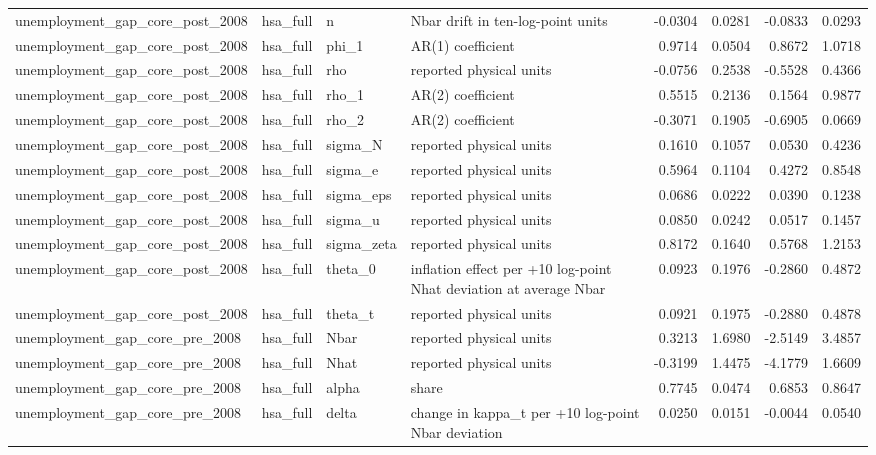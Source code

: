 \begin{tabular}{llllrrrr}
unemployment\_gap\_core\_post\_2008 & hsa\_full & n & Nbar drift in ten-log-point units & -0.0304 & 0.0281 & -0.0833 & 0.0293 \\
unemployment\_gap\_core\_post\_2008 & hsa\_full & phi\_1 & AR(1) coefficient & 0.9714 & 0.0504 & 0.8672 & 1.0718 \\
unemployment\_gap\_core\_post\_2008 & hsa\_full & rho & reported physical units & -0.0756 & 0.2538 & -0.5528 & 0.4366 \\
unemployment\_gap\_core\_post\_2008 & hsa\_full & rho\_1 & AR(2) coefficient & 0.5515 & 0.2136 & 0.1564 & 0.9877 \\
unemployment\_gap\_core\_post\_2008 & hsa\_full & rho\_2 & AR(2) coefficient & -0.3071 & 0.1905 & -0.6905 & 0.0669 \\
unemployment\_gap\_core\_post\_2008 & hsa\_full & sigma\_N & reported physical units & 0.1610 & 0.1057 & 0.0530 & 0.4236 \\
unemployment\_gap\_core\_post\_2008 & hsa\_full & sigma\_e & reported physical units & 0.5964 & 0.1104 & 0.4272 & 0.8548 \\
unemployment\_gap\_core\_post\_2008 & hsa\_full & sigma\_eps & reported physical units & 0.0686 & 0.0222 & 0.0390 & 0.1238 \\
unemployment\_gap\_core\_post\_2008 & hsa\_full & sigma\_u & reported physical units & 0.0850 & 0.0242 & 0.0517 & 0.1457 \\
unemployment\_gap\_core\_post\_2008 & hsa\_full & sigma\_zeta & reported physical units & 0.8172 & 0.1640 & 0.5768 & 1.2153 \\
unemployment\_gap\_core\_post\_2008 & hsa\_full & theta\_0 & inflation effect per +10 log-point Nhat deviation at average Nbar & 0.0923 & 0.1976 & -0.2860 & 0.4872 \\
unemployment\_gap\_core\_post\_2008 & hsa\_full & theta\_t & reported physical units & 0.0921 & 0.1975 & -0.2880 & 0.4878 \\
unemployment\_gap\_core\_pre\_2008 & hsa\_full & Nbar & reported physical units & 0.3213 & 1.6980 & -2.5149 & 3.4857 \\
unemployment\_gap\_core\_pre\_2008 & hsa\_full & Nhat & reported physical units & -0.3199 & 1.4475 & -4.1779 & 1.6609 \\
unemployment\_gap\_core\_pre\_2008 & hsa\_full & alpha & share & 0.7745 & 0.0474 & 0.6853 & 0.8647 \\
unemployment\_gap\_core\_pre\_2008 & hsa\_full & delta & change in kappa\_t per +10 log-point Nbar deviation & 0.0250 & 0.0151 & -0.0044 & 0.0540 \\

\end{tabular}
